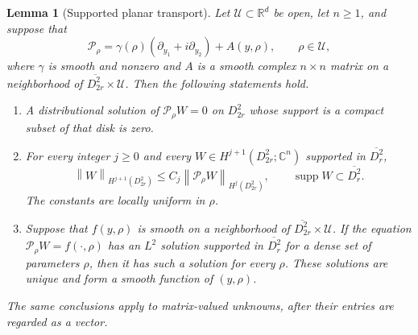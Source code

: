 \documentclass[11pt]{article}
\newcommand{\R}{\mathbb R}
\newcommand{\C}{\mathbb C}
\DeclareMathOperator{\supp}{supp}
\newcommand{\norm}[1]{\left\lVert #1\right\rVert}
\newcommand{\Pcal}{\mathcal P}
\newtheorem{lemma}[theorem]{Lemma}
\theoremstyle{remark}
\numberwithin{equation}{section}
\begin{document}
\begin{lemma}[Supported planar transport]\label{lem:supported-transport}
Let $\mathcal U\subset\R^d$ be open, let $n\geq1$, and suppose that
\[
 \Pcal_\rho
   =\gamma(\rho)(\partial_{y_1}+i\partial_{y_2})
       +A(y,\rho),
 \qquad \rho\in\mathcal U,
\]
where $\gamma$ is smooth and nonzero and $A$ is a smooth complex
$n\times n$ matrix on a neighborhood of
$\overline{D_{2r}^2}\times\mathcal U$. Then the following statements hold.
\begin{enumerate}[label=\textup{(\roman*)}]
\item A distributional solution of $\Pcal_\rho W=0$ on $D_{2r}^2$
whose support is a compact subset of that disk is zero.
\item For every integer $j\geq0$ and every
$W\in H^{j+1}(D_{2r}^2;\C^n)$ supported in $\overline{D_r^2}$,
\begin{equation}\label{eq:supported-transport-estimate}
 \norm{W}_{H^{j+1}(D_{2r}^2)}
 \leq C_j\norm{\Pcal_\rho W}_{H^j(D_{2r}^2)},
 \qquad
 \supp W\subset\overline{D_r^2}.
\end{equation}
The constants are locally uniform in $\rho$.
\item Suppose that $f(y,\rho)$ is smooth on a neighborhood of
$\overline{D_{2r}^2}\times\mathcal U$. If the equation
$\Pcal_\rho W=f(\cdot,\rho)$ has an $L^2$ solution supported in
$\overline{D_r^2}$ for a dense set of parameters $\rho$, then it has
such a solution for every $\rho$. These solutions are unique and form
a smooth function of $(y,\rho)$.
\end{enumerate}
The same conclusions apply to matrix-valued unknowns, after their
entries are regarded as a vector.
\end{lemma}
\end{document}
